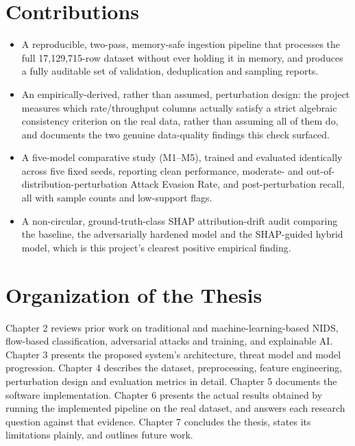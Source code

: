 \documentclass[12pt,a4paper]{report}
\begin{document}
\section{Contributions}
\begin{itemize}\setlength\itemsep{2pt}\item A reproducible, two-pass, memory-safe ingestion pipeline that processes the full 17,129,715-row dataset without ever holding it in memory, and produces a fully auditable set of validation, deduplication and sampling reports.\end{itemize}
\begin{itemize}\setlength\itemsep{2pt}\item An empirically-derived, rather than assumed, perturbation design: the project measures which rate/throughput columns actually satisfy a strict algebraic consistency criterion on the real data, rather than assuming all of them do, and documents the two genuine data-quality findings this check surfaced.\end{itemize}
\begin{itemize}\setlength\itemsep{2pt}\item A five-model comparative study (M1--M5), trained and evaluated identically across five fixed seeds, reporting clean performance, moderate- and out-of-distribution-perturbation Attack Evasion Rate, and post-perturbation recall, all with sample counts and low-support flags.\end{itemize}
\begin{itemize}\setlength\itemsep{2pt}\item A non-circular, ground-truth-class SHAP attribution-drift audit comparing the baseline, the adversarially hardened model and the SHAP-guided hybrid model, which is this project's clearest positive empirical finding.\end{itemize}
\section{Organization of the Thesis}
Chapter 2 reviews prior work on traditional and machine-learning-based NIDS, flow-based classification, adversarial attacks and training, and explainable AI. Chapter 3 presents the proposed system's architecture, threat model and model progression. Chapter 4 describes the dataset, preprocessing, feature engineering, perturbation design and evaluation metrics in detail. Chapter 5 documents the software implementation. Chapter 6 presents the actual results obtained by running the implemented pipeline on the real dataset, and answers each research question against that evidence. Chapter 7 concludes the thesis, states its limitations plainly, and outlines future work.
\end{document}
